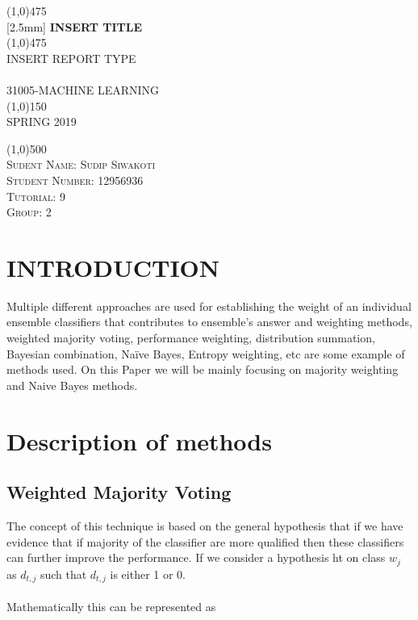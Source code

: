 \documentclass{article}
\begin{document}
\begin{titlepage}
	\begin{center}
    \line(1,0){475}\\
   [2.5mm]
    \huge{\bfseries INSERT TITLE}\\
    \line(1,0){475}\\
    [3mm]
    \textsc{\Large INSERT REPORT TYPE}\\
    [6cm]
    \textsc{\small \\
    [1mm]
    31005-MACHINE LEARNING\\
    \line(1,0){150}\\
    SPRING 2019}\\
    [6.cm]
    \end{center}
    \begin{flushleft}
    \line(1,0){500}\\
    \textsc{\large Sudent Name: Sudip Siwakoti \\Student Number: 12956936\\ Tutorial: 9 \\ Group: 2 }
    \end{flushleft}
    \lipsum[0]
\end{titlepage}
\tableofcontents
\thispagestyle{empty}
\cleardoublepage
\setcounter{page}{1}

\section{INTRODUCTION}\label{sec:intor}


Multiple different approaches are used for establishing the weight of an individual ensemble classifiers that contributes to ensemble’s answer and weighting methods, weighted majority voting, performance weighting, distribution summation, Bayesian combination, Naïve Bayes, Entropy weighting, etc are some example of methods used. On this Paper we will be mainly focusing on majority weighting and Naive Bayes methods.
\section{Description of methods}
\subsection{Weighted Majority Voting}\label{SEC:Methods }
The concept of this technique is based on the general hypothesis that if we have evidence that if majority of the classifier are more qualified then these classifiers can further improve the performance. If we consider a hypothesis ht on class $w_j$ as $d_{t,j}$ such that $d_{t,j}$ is either 1 or 0.\\
\\
Mathematically this can be represented as
\end{document}
